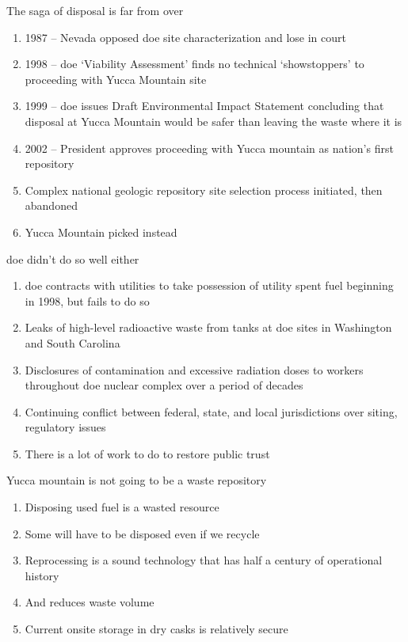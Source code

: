 \documentclass[aspectratio=1610,pdftex,dvipsnames,compress,xcolor={dvipsnames}]{beamer}
\newcommand{\acs}{\acrshort} %
\begin{document}
\begin{frame}{The saga of disposal is far from over}
    \begin{enumerate}[series=outerlist,topsep=0pt,itemsep=21pt,leftmargin=*,label=(\arabic*)]
        \item[]1987 -- Nevada opposed \acs{doe} site characterization and lose in court
        \item[]1998 -- \acs{doe} `Viability Assessment' finds no technical `showstoppers' to proceeding with Yucca Mountain site 
        \item[]1999 -- \acs{doe} issues Draft Environmental Impact Statement concluding that disposal at Yucca Mountain would be safer than leaving the waste where it is
        \item[]2002 -- President approves proceeding with Yucca mountain as nation's first repository
        \item[]Complex national geologic repository site selection process initiated, then abandoned
        \item[]Yucca Mountain picked instead
    \end{enumerate}
\end{frame}


\begin{frame}{\acs{doe} didn't do so well either}
    \begin{enumerate}[series=outerlist,topsep=0pt,itemsep=21pt,leftmargin=*,label=(\arabic*)]
        \item[]\acs{doe} contracts with utilities to take possession of utility spent fuel beginning in 1998, but fails to do so
        \item[]Leaks of high-level radioactive waste from tanks at \acs{doe} sites in Washington and South Carolina
        \item[]Disclosures of contamination and excessive radiation doses to workers throughout \acs{doe} nuclear complex over a period of decades
        \item[]Continuing conflict between federal, state, and local jurisdictions over siting, regulatory issues
        \item[]There is a lot of work to do to restore public trust
    \end{enumerate}
\end{frame}


\begin{frame}{Yucca mountain is not going to be a waste repository}
    \begin{enumerate}[series=outerlist,topsep=0pt,itemsep=21pt,leftmargin=*,label=(\arabic*)]
        \item[]Disposing used fuel is a wasted resource
        \item[]Some will have to be disposed even if we recycle
        \item[]Reprocessing is a sound technology that has half a century of operational history
        \item[]And reduces waste volume
        \item[]Current onsite storage in dry casks is relatively secure
    \end{enumerate}
\end{frame}
\end{document}

